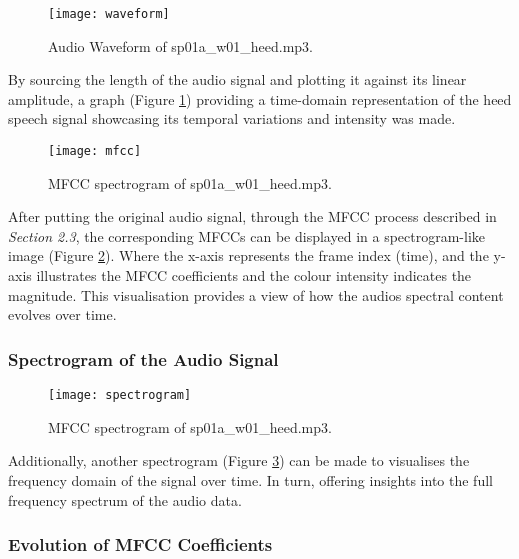 \documentclass{article}
\begin{document}
\begin{figure}[!h]
\begin{center}
\texttt{[image: waveform]}
\end{center}
\caption{\label{fig:waveform} Audio Waveform of sp01a\_w01\_heed.mp3.}
\end{figure}

By sourcing the length of the audio signal and plotting it against its linear amplitude,  a graph (Figure \ref{fig:waveform}) providing a time-domain representation of the heed speech signal showcasing its temporal variations and intensity was made.

\begin{figure}[!h]
\begin{center}
\texttt{[image: mfcc]}
\end{center}
\caption{\label{fig:mfcc} MFCC spectrogram of sp01a\_w01\_heed.mp3.}
\end{figure}

After putting the original audio signal, through the MFCC process described in \textit{Section 2.3}, the corresponding MFCCs can be displayed in a spectrogram-like image (Figure \ref{fig:mfcc}). Where the x-axis represents the frame index (time), and the y-axis illustrates the MFCC coefficients and the colour intensity indicates the magnitude. This visualisation provides a view of how the audios spectral content evolves over time.


\subsubsection{Spectrogram of the Audio Signal}

\begin{figure}[!h]
\begin{center}
\texttt{[image: spectrogram]}
\end{center}
\caption{\label{fig:spectrogram} MFCC spectrogram of sp01a\_w01\_heed.mp3.}
\end{figure}

Additionally, another spectrogram (Figure \ref{fig:spectrogram}) can be made to visualises the frequency domain of the signal over time. In turn, offering insights into the full frequency spectrum of the audio data.


\subsubsection{Evolution of MFCC Coefficients}
\end{document}
